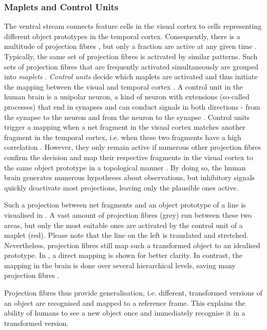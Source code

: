 \subsubsection{Maplets and Control Units}
The ventral stream  connects feature cells in the visual cortex to cells representing different object prototypes in the temporal cortex.  
Consequently, there is a multitude of projection fibres , but only a fraction are active at any given time .
Typically, the same set of projection fibres is activated by similar patterns.
Such sets of projection fibres that are frequently activated simultaneously are grouped into \emph{maplets} .
\emph{Control units} decide which maplets are activated and thus initiate the mapping between the visual and temporal cortex \cite{zhu_maplets_2004}. 
A control unit in the human brain is a unipolar neuron, a kind of neuron with extensions (so-called processes) that end in synapses and can conduct signals in both directions - from the synapse to the neuron and from the neuron to the synapse .
Control units trigger a mapping when a net fragment in the visual cortex matches another fragment in the temporal cortex, i.e. when these two fragments have a high correlation \cite{zhu_maplets_2004}. However, they only remain active if numerous other projection fibres confirm the decision and map their respective fragments in the visual cortex to the same object prototype in a topological manner . By doing so, the human brain generates numerous hypotheses about observations, but inhibitory signals quickly deactivate most projections, leaving only the plausible ones active.

Such a projection between net fragments and an object prototype of a line is visualised in . A vast amount of projection fibres (grey) run between these two areas, but only the most suitable ones are activated by the control unit of a maplet (red).
Please note that the line on the left is translated and stretched. Nevertheless, projection fibres still map such a transformed object to an idealised prototype.
In , a direct mapping is shown for better clarity. In contrast, the mapping in the brain is done over several hierarchical levels, saving many projection fibres .

Projection fibres thus provide generalisation, i.e. different, transformed versions of an object are recognised and mapped to a reference frame. This explains the ability of humans to see a new object once and immediately recognise it in a transformed version.

